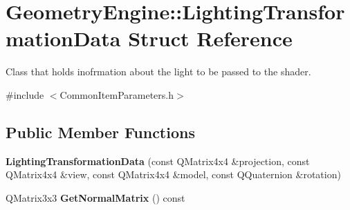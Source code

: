 \hypertarget{struct_geometry_engine_1_1_lighting_transformation_data}{}\section{Geometry\+Engine\+::Lighting\+Transformation\+Data Struct Reference}
\label{struct_geometry_engine_1_1_lighting_transformation_data}


Class that holds inofrmation about the light to be passed to the shader.  




{\ttfamily \#include $<$Common\+Item\+Parameters.\+h$>$}

\subsection*{Public Member Functions}
\begin{DoxyCompactItemize}
\item 
\mbox{\label{struct_geometry_engine_1_1_lighting_transformation_data_a5c7a44a5945d687cf63a45b3079b9e5d}} 
{\bfseries Lighting\+Transformation\+Data} (const Q\+Matrix4x4 \&projection, const Q\+Matrix4x4 \&view, const Q\+Matrix4x4 \&model, const Q\+Quaternion \&rotation)
\item 
\mbox{\label{struct_geometry_engine_1_1_lighting_transformation_data_a64eae6bccd6826058a41e97c80b83fd3}} 
Q\+Matrix3x3 {\bfseries Get\+Normal\+Matrix} () const
\end{DoxyCompactItemize}
